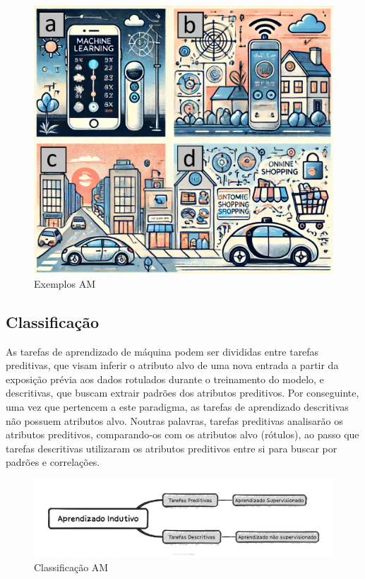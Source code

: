 \documentclass[a4paper,12pt]{book}
\begin{document}
	\begin{figure}
		\centering
		\includegraphics[width=0.7\linewidth]{figuras/exemplos_am}
		\caption{Exemplos AM}
		\label{fig:exemplosam}
	\end{figure}

	\subsection{Classificação}

	As tarefas de aprendizado de máquina podem ser divididas entre tarefas preditivas, que visam inferir o atributo alvo de uma nova entrada a partir da exposição prévia aos dados rotulados durante o treinamento do modelo, e descritivas, que buscam extrair padrões dos atributos preditivos. Por conseguinte, uma vez que pertencem a este paradigma, as tarefas de aprendizado descritivas não possuem atributos alvo. Noutras palavras, tarefas preditivas analisarão os atributos preditivos, comparando-os com os atributos alvo (rótulos), ao passo que tarefas descritivas utilizaram os atributos preditivos entre si para buscar por padrões e correlações.

	\begin{figure}
		\centering
		\includegraphics[width=1\linewidth]{figuras/indutivo.png}
		\caption{Classificação AM}
		\label{fig:indutivo}
	\end{figure}
\end{document}
